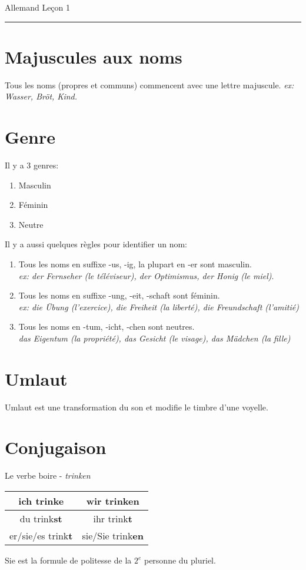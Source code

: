\documentclass[12pt]{article}
\begin{document}
\noindent Allemand \hfill Leçon 1 
\hrule
\section{Majuscules aux noms}
Tous les noms (propres et communs) commencent avec une lettre majuscule. 
\textit{ex: Wasser, Bröt, Kind.}
\section{Genre}
Il y a 3 genres: 
\begin{enumerate}
    \item Masculin
    \item Féminin
    \item Neutre
\end{enumerate}
Il y a aussi quelques règles pour identifier un nom:
\begin{enumerate}
    \item Tous les noms en suffixe -us, -ig,
    la plupart en -er sont masculin. \\
    \textit{ex: der Fernseher (le téléviseur), der Optimismus, der Honig (le miel)}.
    \item Tous les noms en suffixe -ung, -eit, -schaft sont féminin.\\
    \textit{ex: die Übung (l'exercice), die Freiheit (la liberté), die Freundschaft (l'amitié)}
    \item Tous les noms en -tum, -icht, -chen sont neutres.\\
    \textit{das Eigentum (la propriété), das Gesicht (le visage), das Mädchen (la fille)}
\end{enumerate}
\section{Umlaut}
Umlaut est une  transformation du son  et modifie le timbre d'une voyelle.
\section{Conjugaison}
Le verbe boire - \textit{trinken}
\begin{center}
\begin{tabular}{|c|c|}
        \hline
        ich trink\textbf{e} & wir trink\textbf{en}  \\
        \hline
	    du trink\textbf{st} & ihr trink\textbf{t} \\
        \hline
	    er/sie/es trink\textbf{t} & sie/Sie trink\textbf{en}\\
        \hline
    \end{tabular}
\end{center}
Sie est la formule de politesse de la $2^e$ personne du pluriel.\\\\
\end{document}
